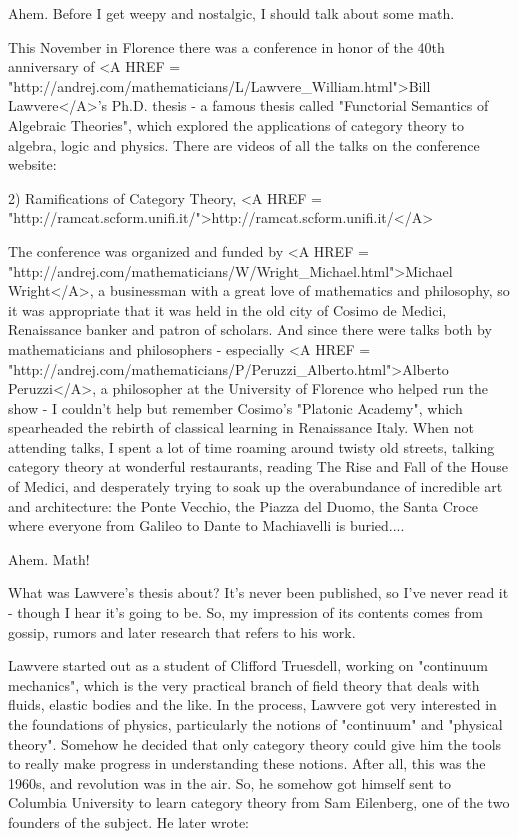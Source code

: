 Ahem.  Before I get weepy and nostalgic, I should talk about some math.  

This November in Florence there was a conference in honor of the 40th 
anniversary of <A HREF = "http://andrej.com/mathematicians/L/Lawvere_William.html">Bill Lawvere</A>'s Ph.D. thesis - a famous thesis called
"Functorial Semantics of Algebraic Theories", which explored the 
applications of category theory to algebra, logic and physics.  
There are videos of all the talks on the conference website:
 
2) Ramifications of Category Theory, <A HREF = "http://ramcat.scform.unifi.it/">http://ramcat.scform.unifi.it/</A>


The conference was organized and funded by <A HREF = "http://andrej.com/mathematicians/W/Wright_Michael.html">Michael Wright</A>, a businessman 
with a great love of mathematics and philosophy, so it was appropriate 
that it was held in the old city of Cosimo de Medici, Renaissance banker 
and patron of scholars.  And since there were talks both by mathematicians
and philosophers - especially <A HREF = "http://andrej.com/mathematicians/P/Peruzzi_Alberto.html">Alberto Peruzzi</A>, a philosopher at the
University of Florence who helped run the show - I couldn't help but 
remember Cosimo's "Platonic Academy", which spearheaded the rebirth of 
classical learning in Renaissance Italy.  When not attending talks, I 
spent a lot of time roaming around twisty old streets, talking category 
theory at wonderful restaurants, reading The Rise and Fall of the House 
of Medici, and desperately trying to soak up the overabundance of incredible
art and architecture: the Ponte Vecchio, the Piazza del Duomo, the Santa
Croce where everyone from Galileo to Dante to Machiavelli is buried....

Ahem.  Math!

What was Lawvere's thesis about?  It's never been published, so I've 
never read it - though I hear it's going to be.   So, my impression of 
its contents comes from gossip, rumors and later research that refers to 
his work.

Lawvere started out as a student of Clifford Truesdell, working 
on "continuum mechanics", which is the very practical branch of field 
theory that deals with fluids, elastic bodies and the like.  In the
process, Lawvere got very interested in the foundations of physics, 
particularly the notions of "continuum" and "physical theory".  
Somehow he decided that only category theory could give him the tools
to really make progress in understanding these notions.  After all, this
was the 1960s, and revolution was in the air.  So, he somehow got himself 
sent to Columbia University to learn category theory from Sam Eilenberg, 
one of the two founders of the subject.  He later wrote:

